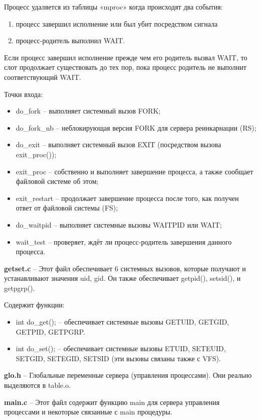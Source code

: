Процесс удаляется из таблицы «mproc» когда происходят два события:
\begin{enumerate}
\item процесс завершил исполнение или был убит посредством сигнала
\item процесс-родитель выполнил WAIT.
\end{enumerate}

Если процесс завершил исполнение прежде чем его родитель вызвал WAIT, то слот продолжает существовать до тех пор, пока процесс родитель не выполнит соответствующий WAIT.

Точки входа:
\begin{itemize}
\item do\_fork -- выполняет системный вызов FORK;
\item do\_fork\_nb -- неблокирующая версия FORK для сервера реинкарнации (RS);
\item do\_exit -- выполняет системный вызов EXIT (посредством вызова exit\_proc());
\item exit\_proc -- собственно и выполняет завершение процесса, а также сообщает файловой системе об этом;
\item exit\_restart -- продолжает завершение процесса после того, как получен ответ от файловой системы (FS);
\item do\_waitpid -- выполняет системные вызовы WAITPID или WAIT;
\item wait\_test -- проверяет, ждёт ли процесс-родитель завершения данного процесса.
\end{itemize}

\textbf{getset.c} -- Этот файл обеспечивает 6 системных вызовов, которые получают и устанавливают значения uid, gid. Он также обеспечивает getpid(), setsid(), и getpgrp().

Содержит функции:
\begin{itemize}
\item int do\_get(); -- обеспечивает системные вызовы GETUID, GETGID, GETPID, GETPGRP.
\item int do\_set(); -- обеспечивает системные вызовы ETUID, SETEUID, SETGID, SETEGID, SETSID (эти вызовы связаны также с VFS).
\end{itemize}

\textbf{glo.h} -- Глобальные переменные сервера (управления процессами). Они реально выделяются в table.o.

\textbf{main.c} -- Этот файл содержит функцию main для сервера управления процессами и некоторые связанные с main процедуры.

